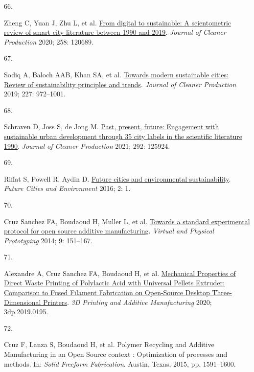 \documentclass[
  11pt,
  a4paperpaper,
  onecolumn]{article}
\newlength{\cslhangindent}
\newlength{\csllabelwidth}
\newlength{\cslentryspacingunit} %
\newenvironment{CSLReferences}[2] %
 {%
  \setlength{\parindent}{0pt}
  \ifodd #1
  \let\oldpar\par
  \def\par{\hangindent=\cslhangindent\oldpar}
  \fi
  \setlength{\parskip}{#2\cslentryspacingunit}
 }%
 {}
\newcommand{\CSLLeftMargin}[1]{\parbox[t]{\csllabelwidth}{#1}}
\newcommand{\CSLRightInline}[1]{\parbox[t]{\linewidth - \csllabelwidth}{#1}\break}
\begin{document}
\begin{CSLReferences}{0}{0}
\leavevmode{}%
\CSLLeftMargin{66. }%
\CSLRightInline{Zheng C, Yuan J, Zhu L, et al.
\href{https://doi.org/10.1016/j.jclepro.2020.120689}{From digital to
sustainable: {A} scientometric review of smart city literature between
1990 and 2019}. \emph{Journal of Cleaner Production} 2020; 258: 120689.}

\leavevmode{}%
\CSLLeftMargin{67. }%
\CSLRightInline{Sodiq A, Baloch AAB, Khan SA, et al.
\href{https://doi.org/10.1016/j.jclepro.2019.04.106}{Towards modern
sustainable cities: {Review} of sustainability principles and trends}.
\emph{Journal of Cleaner Production} 2019; 227: 972--1001.}

\leavevmode{}%
\CSLLeftMargin{68. }%
\CSLRightInline{Schraven D, Joss S, de Jong M.
\href{https://doi.org/10.1016/j.jclepro.2021.125924}{Past, present,
future: {Engagement} with sustainable urban development through 35 city
labels in the scientific literature 1990\textendash 2019}. \emph{Journal
of Cleaner Production} 2021; 292: 125924.}

\leavevmode{}%
\CSLLeftMargin{69. }%
\CSLRightInline{Riffat S, Powell R, Aydin D.
\href{https://doi.org/10.1186/s40984-016-0014-2}{Future cities and
environmental sustainability}. \emph{Future Cities and Environment}
2016; 2: 1.}

\leavevmode{}%
\CSLLeftMargin{70. }%
\CSLRightInline{Cruz Sanchez FA, Boudaoud H, Muller L, et al.
\href{https://doi.org/10.1080/17452759.2014.919553}{Towards a standard
experimental protocol for open source additive manufacturing}.
\emph{Virtual and Physical Prototyping} 2014; 9: 151--167.}

\leavevmode{}%
\CSLLeftMargin{71. }%
\CSLRightInline{Alexandre A, Cruz Sanchez FA, Boudaoud H, et al.
\href{https://doi.org/10.1089/3dp.2019.0195}{Mechanical {Properties} of
{Direct Waste Printing} of {Polylactic Acid} with {Universal Pellets
Extruder}: {Comparison} to {Fused Filament Fabrication} on {Open-Source
Desktop Three-Dimensional Printers}}. \emph{3D Printing and Additive
Manufacturing} 2020; 3dp.2019.0195.}

\leavevmode{}%
\CSLLeftMargin{72. }%
\CSLRightInline{Cruz F, Lanza S, Boudaoud H, et al. Polymer {Recycling}
and {Additive Manufacturing} in an {Open Source} context :
{Optimization} of processes and methods. In: \emph{Solid {Freeform
Fabrication}}. {Austin, Texas}, 2015, pp. 1591--1600.}


\end{CSLReferences}
\end{document}
